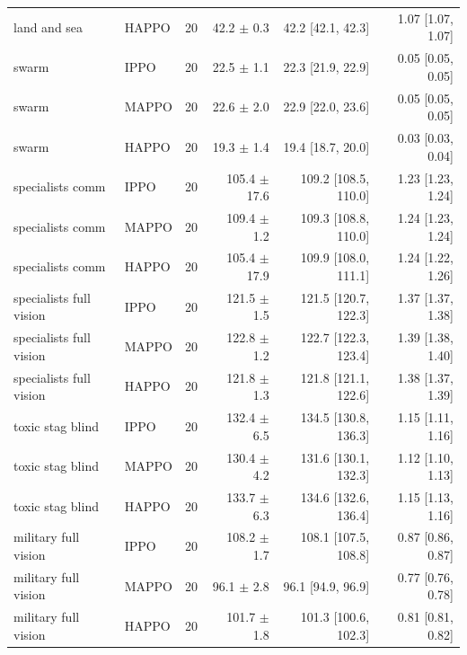 \begin{tabular}{llrrrr}
land and sea & HAPPO & 20 & 42.2 $\pm$ 0.3 & 42.2 [42.1, 42.3] & 1.07 [1.07, 1.07] \\
swarm & IPPO & 20 & 22.5 $\pm$ 1.1 & 22.3 [21.9, 22.9] & 0.05 [0.05, 0.05] \\
swarm & MAPPO & 20 & 22.6 $\pm$ 2.0 & 22.9 [22.0, 23.6] & 0.05 [0.05, 0.05] \\
swarm & HAPPO & 20 & 19.3 $\pm$ 1.4 & 19.4 [18.7, 20.0] & 0.03 [0.03, 0.04] \\
specialists comm & IPPO & 20 & 105.4 $\pm$ 17.6 & 109.2 [108.5, 110.0] & 1.23 [1.23, 1.24] \\
specialists comm & MAPPO & 20 & 109.4 $\pm$ 1.2 & 109.3 [108.8, 110.0] & 1.24 [1.23, 1.24] \\
specialists comm & HAPPO & 20 & 105.4 $\pm$ 17.9 & 109.9 [108.0, 111.1] & 1.24 [1.22, 1.26] \\
specialists full vision & IPPO & 20 & 121.5 $\pm$ 1.5 & 121.5 [120.7, 122.3] & 1.37 [1.37, 1.38] \\
specialists full vision & MAPPO & 20 & 122.8 $\pm$ 1.2 & 122.7 [122.3, 123.4] & 1.39 [1.38, 1.40] \\
specialists full vision & HAPPO & 20 & 121.8 $\pm$ 1.3 & 121.8 [121.1, 122.6] & 1.38 [1.37, 1.39] \\
toxic stag blind & IPPO & 20 & 132.4 $\pm$ 6.5 & 134.5 [130.8, 136.3] & 1.15 [1.11, 1.16] \\
toxic stag blind & MAPPO & 20 & 130.4 $\pm$ 4.2 & 131.6 [130.1, 132.3] & 1.12 [1.10, 1.13] \\
toxic stag blind & HAPPO & 20 & 133.7 $\pm$ 6.3 & 134.6 [132.6, 136.4] & 1.15 [1.13, 1.16] \\
military full vision & IPPO & 20 & 108.2 $\pm$ 1.7 & 108.1 [107.5, 108.8] & 0.87 [0.86, 0.87] \\
military full vision & MAPPO & 20 & 96.1 $\pm$ 2.8 & 96.1 [94.9, 96.9] & 0.77 [0.76, 0.78] \\
military full vision & HAPPO & 20 & 101.7 $\pm$ 1.8 & 101.3 [100.6, 102.3] & 0.81 [0.81, 0.82] \\
\bottomrule
\end{tabular}
